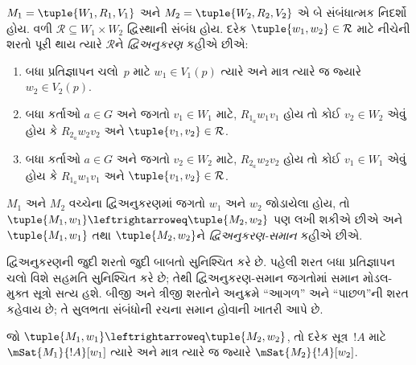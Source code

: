 \begin{defn}[દ્વિઅનુકરણ]
$M_1 = \tuple{W_1, R_1, V_1}$ અને $M_2 = \tuple{W_2, R_2, V_2}$
એ બે સંબંધાત્મક નિદર્શો હોય. વળી $\mathcal{R} \subseteq W_1 \times W_2$
દ્વિસ્થાની સંબંધ હોય. દરેક $\tuple{w_1, w_2} \in \mathcal{R}$
માટે નીચેની શરતો પૂરી થાય ત્યારે $\mathcal{R}$ને
\emph{દ્વિઅનુકરણ} કહીએ છીએ:

\begin{enumerate}
  \item બધા પ્રતિજ્ઞાપન ચલો~$p$ માટે
  $w_1 \in V_1(p)$ ત્યારે અને માત્ર ત્યારે જ જ્યારે $w_2 \in V_2(p)$.
  \item બધા કર્તાઓ $a \in G$ અને જગતો $v_1 \in W_1$ માટે,
  $R_{1_a} w_1 v_1$ હોય તો કોઈ $v_2 \in W_2$ એવું હોય કે
  $R_{2_a} w_2 v_2$ અને $\tuple{v_1, v_2} \in
  \mathcal{R}$.
  \item બધા કર્તાઓ $a \in G$ અને જગતો $v_2 \in W_2$ માટે,
  $R_{2_a} w_2 v_2$ હોય તો કોઈ $v_1 \in W_1$ એવું હોય કે
  $R_{1_a} w_1 v_1$ અને $\tuple{v_1, v_2} \in
  \mathcal{R}$.
\end{enumerate}

$M_1$ અને $M_2$ વચ્ચેના દ્વિઅનુકરણમાં જગતો $w_1$ અને $w_2$
જોડાયેલા હોય, તો $\tuple{M_1, w_1} \leftrightarroweq
\tuple{M_2, w_2}$ પણ લખી શકીએ છીએ અને $\tuple{M_1, w_1}$ તથા
$\tuple{M_2, w_2}$ને \emph{દ્વિઅનુકરણ-સમાન} કહીએ છીએ.
\end{defn}

દ્વિઅનુકરણની જુદી શરતો જુદી બાબતો સુનિશ્ચિત કરે છે.
પહેલી શરત બધા પ્રતિજ્ઞાપન ચલો વિશે સહમતિ
સુનિશ્ચિત કરે છે; તેથી દ્વિઅનુકરણ-સમાન જગતોમાં સમાન
મોડલ-મુક્ત સૂત્રો સત્ય હશે. બીજી અને ત્રીજી શરતોને અનુક્રમે
``આગળ'' અને ``પાછળ''ની શરત કહેવાય છે; તે સુલભતા સંબંધોની
રચના સમાન હોવાની ખાતરી આપે છે.

\begin{thm}
જો $\tuple{M_1, w_1} \leftrightarroweq \tuple{M_2, w_2}$, તો દરેક
સૂત્ર~$!A$ માટે $\mSat{M_1}{!A}[w_1]$ ત્યારે અને માત્ર
ત્યારે જ જ્યારે $\mSat{M_2}{!A}[w_2]$.
\end{thm}

